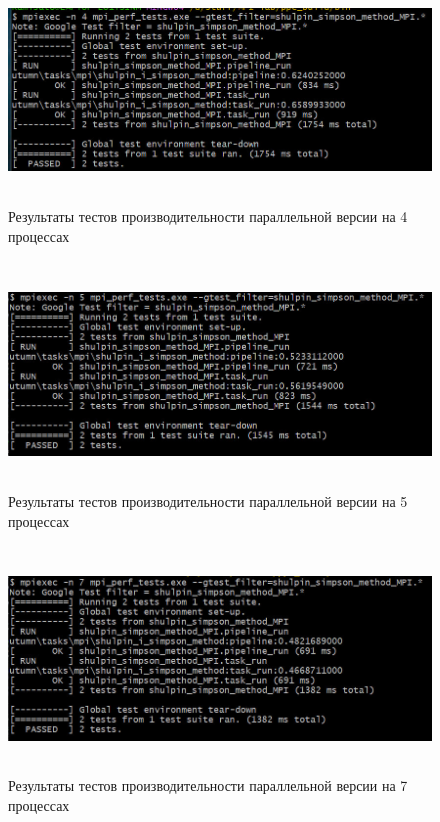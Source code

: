 \documentclass[12pt,a4paper]{article}
\begin{document}
\begin{figure}[H]
\centering
\includegraphics[height=6cm]{img/4nmpiperftest.jpg}
\caption{\label{fig:visualClass} Результаты тестов производительности параллельной версии на 4 процессах}
\end{figure}

\begin{figure}[H]
\centering
\includegraphics[height=6cm]{img/5nmpiperftest.jpg}
\caption{\label{fig:visualClass} Результаты тестов производительности параллельной версии на 5 процессах}
\end{figure}

\begin{figure}[H]
\centering
\includegraphics[height=6cm]{img/7nmpiperftest.jpg}
\caption{\label{fig:visualClass} Результаты тестов производительности параллельной версии на 7 процессах}
\end{figure}
\end{document}
